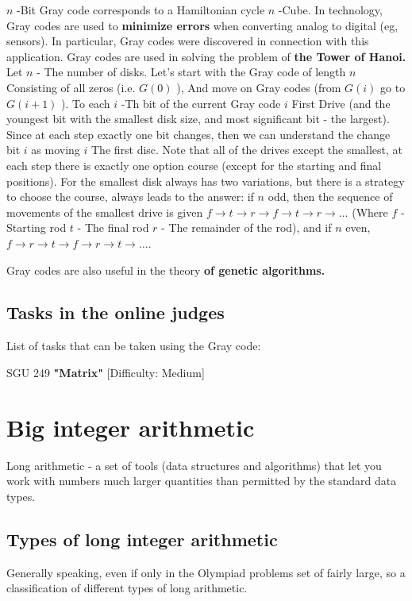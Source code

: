 $n$ -Bit Gray code corresponds to a Hamiltonian cycle $n$ -Cube.
In technology, Gray codes are used to \textbf{minimize errors} when converting analog to digital (eg, sensors). In particular, Gray codes were discovered in connection with this application.
Gray codes are used in solving the problem of \textbf{the Tower of Hanoi.}
Let $n$ - The number of disks. Let's start with the Gray code of length $n$ Consisting of all zeros (i.e. $G (0)$ ), And move on Gray codes (from $G (i)$ go to $G (i +1)$ ). To each $i$ -Th bit of the current Gray code $i$ First Drive (and the youngest bit with the smallest disk size, and most significant bit - the largest). Since at each step exactly one bit changes, then we can understand the change bit $i$ as moving $i$ The first disc. Note that all of the drives except the smallest, at each step there is exactly one option course (except for the starting and final positions). For the smallest disk always has two variations, but there is a strategy to choose the course, always leads to the answer: if $n$ odd, then the sequence of movements of the smallest drive is given $f \rightarrow t \rightarrow r \rightarrow f \rightarrow t \rightarrow r \rightarrow \ldots$ (Where $f$ - Starting rod $t$ - The final rod $r$ - The remainder of the rod), and if $n$ even, $f \rightarrow r \rightarrow t \rightarrow f \rightarrow r \rightarrow t \rightarrow \ldots$.

Gray codes are also useful in the theory \textbf{of genetic algorithms.}
\subsection{ Tasks in the online judges }

List of tasks that can be taken using the Gray code:

SGU 249 \textbf{"Matrix"} [Difficulty: Medium]
\section{ Big integer arithmetic }
Long arithmetic - a set of tools (data structures and algorithms) that let you work with numbers much larger quantities than permitted by the standard data types.

\subsection{ Types of long integer arithmetic }

Generally speaking, even if only in the Olympiad problems set of fairly large, so a classification of different types of long arithmetic.

